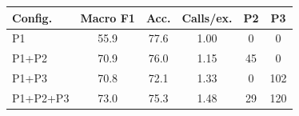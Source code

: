 \begin{tabular}{lccccc}
\toprule
\textbf{Config.} & \textbf{Macro F1} & \textbf{Acc.} & \textbf{Calls/ex.} & \textbf{P2} & \textbf{P3} \\
\midrule
P1 & 55.9 & 77.6 & 1.00 & 0 & 0 \\
P1+P2 & 70.9 & 76.0 & 1.15 & 45 & 0 \\
P1+P3 & 70.8 & 72.1 & 1.33 & 0 & 102 \\
P1+P2+P3 & 73.0 & 75.3 & 1.48 & 29 & 120 \\
\bottomrule
\end{tabular}

